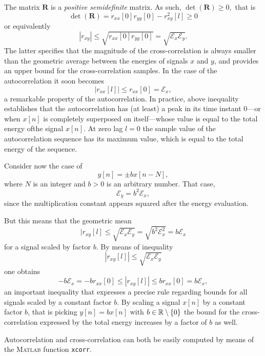 \documentclass[\documentfontsize, twocolumn]{\classname}
\begin{document}
The matrix $\bm R$ is a \emph{positive semidefinite} matrix. As such, $\det {(\bm R)} \geq 0,$ that is \[\det {(\bm R)} =r_{xx}[0]r_{yy}[0] - r^2_{xy}[l] \geq 0\] or equivalently \begin{equation}\label{eqn:crossCorrelationUpperBound}|r_{xy}| \leq \sqrt{r_{xx}[0]r_{yy}[0]}= \sqrt{\mathcal E_x\mathcal E_y}.\end{equation} The latter specifies that the magnitude of the cross-correlation is always smaller than the geometric average between the energies of signals $x$ and $y$, and provides an upper bound for the cross-correlation samples. In the case of the autocorrelation it soon becomes
\begin{equation}\label{eqn:autocorrelationUpperBound}
    |r_{xx}[l]| \leq r_{xx}[0] = \mathcal E_x,
\end{equation}
a remarkable property of the autocorrelation. In practice, above inequality establishes that the autocorrelation has (at least) a peak in its time instant $0$---or when $x[n]$ is completely superposed on itself---whose value is equal to the total energy ofthe signal $x[n]$. At zero lag $l=0$ the sample value of the autocorrelation sequence has its maximum value, which is equal to the total energy of the sequence.

Consider now the case of \[y[n] = \pm b x[n-N],\] where $N$ is an integer and $b>0$ is an arbitrary number. That case, \[\mathcal E_y = b^2\mathcal E_x,\] since the multiplication constant appears squared after the energy evaluation.

But this means that the geometric mean \[|r_{xy}[l] \leq \sqrt{\mathcal E_x \mathcal E_y} = \sqrt{b^2 \mathcal E^2_x} = b\mathcal E_x\] for a signal scaled by factor $b$. By means of inequality
\[
    |r_{xy}[l]| \leq \sqrt{\mathcal E_x \mathcal E_y}
\]
one obtains
\begin{equation}\label{eqn:crossCorrelationScalingBounds}
- b \mathcal E_x = - br_{xx}[0]  \leq |r_{xy}[l]| \leq b r_{xx}[0] = b \mathcal E_x,
\end{equation}
an important inequality that expresses a precise rule regarding bounds for all signals scaled by a constant factor $b$. By scaling a signal $x[n]$ by a constant factor $b$, that is picking $y[n] = bx[n]$ with $b\in\mathbb R\setminus\{0\}$ the bound for the cross-correlation expressed by the total energy increases by a factor of $b$ as well.

Autocorrelation and cross-correlation can both be easily computed by means of the \textsc{Matlab} function \texttt{xcorr}.
\end{document}
